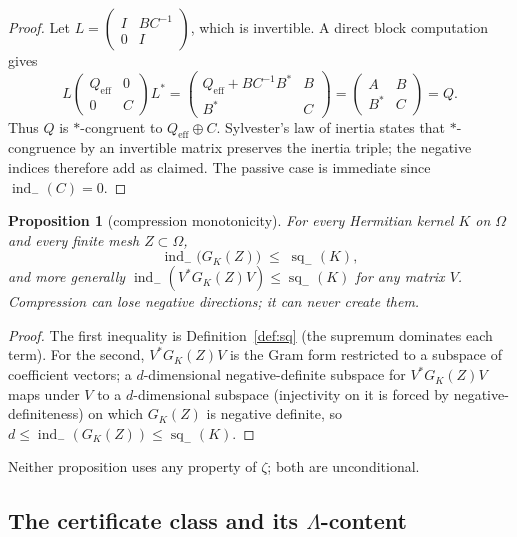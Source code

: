 \documentclass[11pt]{article}
\newtheorem{proposition}[theorem]{Proposition}
\theoremstyle{definition}
\theoremstyle{remark}
\newcommand{\indm}{\operatorname{ind}_{-}}
\newcommand{\sq}{\operatorname{sq}_{-}}
\begin{document}
\begin{proof}
Let $L=\begin{pmatrix}I&BC^{-1}\\ 0&I\end{pmatrix}$, which is invertible. A
direct block computation gives
\[
L\begin{pmatrix}Q_{\mathrm{eff}}&0\\ 0&C\end{pmatrix}L^{*}
=\begin{pmatrix}Q_{\mathrm{eff}}+BC^{-1}B^{*}&B\\ B^{*}&C\end{pmatrix}
=\begin{pmatrix}A&B\\ B^{*}&C\end{pmatrix}=Q .
\]
Thus $Q$ is $*$-congruent to $Q_{\mathrm{eff}}\oplus C$. Sylvester's law of
inertia \cite{Sylvester} states that $*$-congruence by an invertible matrix
preserves the inertia triple; the negative indices therefore add as claimed.
The passive case is immediate since $\indm(C)=0$.
\end{proof}

\begin{proposition}[compression monotonicity]\label{prop:compression}
For every Hermitian kernel $K$ on $\Omega$ and every finite mesh
$Z\subset\Omega$,
\[
\indm\bigl(G_K(Z)\bigr)\;\le\;\sq(K),
\]
and more generally $\indm(V^{*}G_K(Z)V)\le\sq(K)$ for any matrix $V$.
Compression can lose negative directions; it can never create them.
\end{proposition}

\begin{proof}
The first inequality is Definition~\ref{def:sq} (the supremum dominates each
term). For the second, $V^{*}G_K(Z)V$ is the Gram form restricted to a
subspace of coefficient vectors; a $d$-dimensional negative-definite subspace
for $V^{*}G_K(Z)V$ maps under $V$ to a $d$-dimensional subspace (injectivity
on it is forced by negative-definiteness) on which $G_K(Z)$ is negative
definite, so $d\le\indm(G_K(Z))\le\sq(K)$.
\end{proof}

Neither proposition uses any property of $\zeta$; both are unconditional.

\subsection{The certificate class and its $\Lambda$-content}
\end{document}
